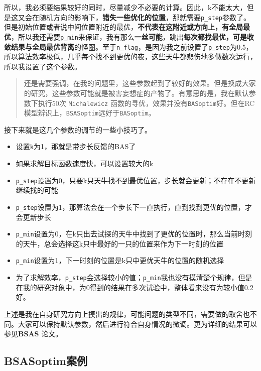 \documentclass[]{ctexbook}
\providecommand{\tightlist}{%
  \setlength{\itemsep}{0pt}\setlength{\parskip}{0pt}}
\begin{document}
所以，我必须要结果较好的同时，尽量减少不必要的计算。因此，k不能太大，但是这又会在随机方向的影响下，\textbf{错失一些优化的位置}，那就需要\texttt{p\_step}参数了。但是初始位置或者说中间位置附近的最优，\textbf{不代表在这附近或方向上，有全局最优}，所以我还需要\texttt{p\_min}来保证，我有那么\textbf{一丝可能}，跳出\textbf{每次都找最优，可是收敛结果与全局最优背离}的怪圈。至于\texttt{n\_flag}，是因为我之前设置了\texttt{p\_step}为0.5，所以算法效率极低，几乎每个找不到更优的夜，这些天牛都悲伤地多做数次运行，所以我设置了这个参数。

\begin{quote}
还是需要强调，在我的问题里，这些参数起到了较好的效果。但是换成大家的研究，这些参数可能就是被害妄想症的产物了。有意思的是，我在默认参数下执行50次
\texttt{Michalewicz}
函数的寻优，效果并没有\texttt{BASoptim}好。但在RC模型辨识上，\texttt{BSASoptim}远好于\texttt{BASoptim}。
\end{quote}

接下来就是这几个参数的调节的一些小技巧了。

\begin{itemize}
\tightlist
\item
  设置\texttt{k}为1，那就是带步长反馈的BAS了
\item
  如果求解目标函数速度快，可以设置较大的k
\item
  \texttt{p\_step}设置为0，只要k只天牛找不到最优位置，步长就会更新；不存在不更新继续找的可能
\item
  \texttt{p\_step}设置为1，那算法会在一个步长下一直执行，直到找到更优的位置，才会更新步长
\item
  \texttt{p\_min}设置为0，在k只出去试探的天牛中找到了更优的位置时，那么当前时刻的天牛，总会选择这k只中最好的一只的位置来作为下一时刻的位置
\item
  \texttt{p\_min}设置为1，下一时刻的位置是k只中更优天牛的位置的随机选择
\item
  为了求解效率，\texttt{p\_step}会选择较小的值；\texttt{p\_min}我也没有摸清楚个规律，但是在我的研究对象中，为0得到的结果在多次试验中，整体看来没有为较小值0.2好。
\end{itemize}

上述是我在自身研究方向上摸出的规律，可能问题的类型不同，需要做的取舍也不同。大家可以保持默认参数，然后进行符合自身情况的微调。更为详细的结果可以参见\textbf{BSAS}
\citep{Wang2018BSAS}论文。

\subsection{BSASoptim案例}\label{BSASexample}
\end{document}
